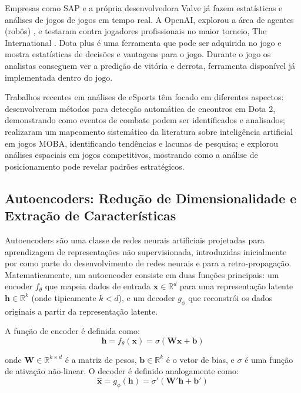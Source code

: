 \documentclass[12pt]{article}
\begin{document}
Empresas como SAP e a própria desenvolvedora Valve já fazem estatísticas e análises de jogos de jogos em tempo real.
A OpenAI, explorou a área de agentes (robôs) \cite{openai2017}, e testaram contra jogadores profissionais no maior torneio, The International \cite{openai2018}. Dota plus é uma ferramenta que pode ser adquirida no jogo e mostra estatísticas de decisões e vantagens para o jogo. Durante o jogo os analistas conseguem ver a predição de vitória e derrota, ferramenta disponível já implementada dentro do jogo.

Trabalhos recentes em análises de eSports têm focado em diferentes aspectos: \cite{schubert2016esports} desenvolveram métodos para detecção automática de encontros em Dota 2, demonstrando como eventos de combate podem ser identificados e analisados; \cite{costa2023artificial} realizaram um mapeamento sistemático da literatura sobre inteligência artificial em jogos MOBA, identificando tendências e lacunas de pesquisa; e \cite{ijas2021spatial} explorou análises espaciais em jogos competitivos, mostrando como a análise de posicionamento pode revelar padrões estratégicos.

\subsection{Autoencoders: Redução de Dimensionalidade e Extração de Características}

Autoencoders são uma classe de redes neurais artificiais projetadas para aprendizagem de representações não supervisionada, introduzidas inicialmente por \cite{rumelhart1986learning} como parte do desenvolvimento de redes neurais e \cite{lecun1988theoretical} para a retro-propagação. Matematicamente, um autoencoder consiste em duas funções principais: um encoder $f_\theta$ que mapeia dados de entrada $\mathbf{x} \in \mathbb{R}^d$ para uma representação latente $\mathbf{h} \in \mathbb{R}^k$ (onde tipicamente $k < d$), e um decoder $g_\phi$ que reconstrói os dados originais a partir da representação latente.

A função de encoder é definida como:
\begin{equation}
\mathbf{h} = f_\theta(\mathbf{x}) = \sigma(\mathbf{W}\mathbf{x} + \mathbf{b})
\end{equation}

onde $\mathbf{W} \in \mathbb{R}^{k \times d}$ é a matriz de pesos, $\mathbf{b} \in \mathbb{R}^k$ é o vetor de bias, e $\sigma$ é uma função de ativação não-linear. O decoder é definido analogamente como:
\begin{equation}
\hat{\mathbf{x}} = g_\phi(\mathbf{h}) = \sigma'(\mathbf{W}'\mathbf{h} + \mathbf{b}')
\end{equation}
\end{document}
